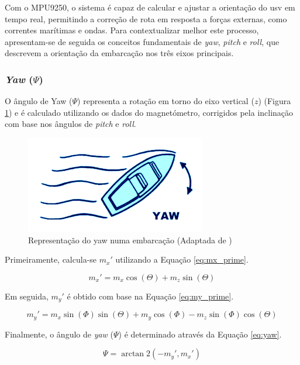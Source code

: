 Com o MPU9250, o sistema é capaz de calcular e ajustar a orientação do \gls{usv} em tempo real, permitindo a correção de rota em resposta a forças externas, como correntes marítimas e ondas. Para contextualizar melhor este processo, apresentam-se de seguida os conceitos fundamentais de \emph{yaw}, \emph{pitch} e \emph{roll}, que descrevem a orientação da embarcação nos três eixos principais.

\subsubsection{\emph{Yaw} (\(\Psi\))}
O ângulo de Yaw (\(\Psi\)) representa a rotação em torno do eixo vertical (\(z\)) (Figura \ref{fig:yaw}) e é calculado utilizando os dados do magnetómetro, corrigidos pela inclinação com base nos ângulos de \emph{pitch} e \emph{roll}. 

\begin{figure}[H]
    \centering
    \includegraphics[height=0.2\linewidth]{figuras/Yaw.png}
    \caption[Representação do yaw numa embarcação]{Representação do yaw numa embarcação (Adaptada de \cite{imagem-yaw-pitch-roll})}
    \label{fig:yaw}
\end{figure}

Primeiramente, calcula-se \(m_x'\) utilizando a Equação \ref{eq:mx_prime}.

\begin{equation}
    m_x' = m_x \cos(\Theta) + m_z \sin(\Theta)
    \label{eq:mx_prime}
\end{equation}

Em seguida, \(m_y'\) é obtido com base na Equação \ref{eq:my_prime}.

\begin{equation}
    m_y' = m_x \sin(\Phi) \sin(\Theta) + m_y \cos(\Phi) - m_z \sin(\Phi) \cos(\Theta)
    \label{eq:my_prime}
\end{equation}

Finalmente, o ângulo de \emph{yaw} (\(\Psi\)) é determinado através da Equação \ref{eq:yaw}. 

\begin{equation}
    \Psi = \arctan2(-m_y', m_x')
    \label{eq:yaw}
\end{equation}

